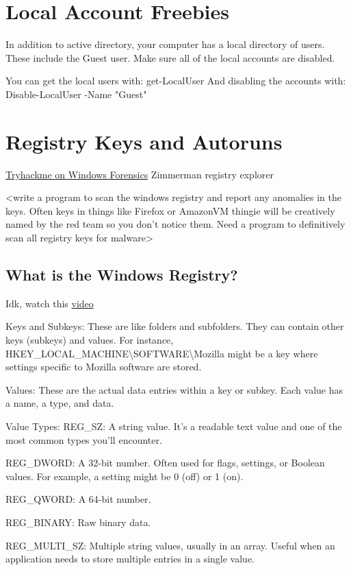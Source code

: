 \documentclass{article}
\begin{document}
\section{Local Account Freebies}
In addition to active directory, your computer has a local directory of users. These include the Guest user.
Make sure all of the local accounts are disabled.

You can get the local users with: get-LocalUser
And disabling the accounts with: Disable-LocalUser -Name "Guest"

\section{Registry Keys and Autoruns}
\href{https://tryhackme.com/room/windowsforensics1}{Tryhackme on Windows Forensics}
Zimmerman registry explorer

<write a program to scan the windows registry and report any anomalies in the keys.
Often keys in things like Firefox or AmazonVM thingie will be creatively named by the red team
so you don't notice them. Need a program to definitively scan all registry keys for malware>

\subsection{What is the Windows Registry?}
Idk, watch this \href{https://youtu.be/_U78iAem3uo}{video}

Keys and Subkeys:
These are like folders and subfolders. They can contain other keys (subkeys) and values.
For instance, HKEY\_LOCAL\_MACHINE\textbackslash SOFTWARE\textbackslash Mozilla might be a key where settings specific to Mozilla software are stored.

Values:
These are the actual data entries within a key or subkey.
Each value has a name, a type, and data.

Value Types:
REG\_SZ: A string value. It's a readable text value and one of the most common types you'll encounter.

REG\_DWORD: A 32-bit number. Often used for flags, settings, or Boolean values. For example, a setting might be 0 (off) or 1 (on).

REG\_QWORD: A 64-bit number.

REG\_BINARY: Raw binary data.

REG\_MULTI\_SZ: Multiple string values, usually in an array. Useful when an application needs to store multiple entries in a single value.
\end{document}
